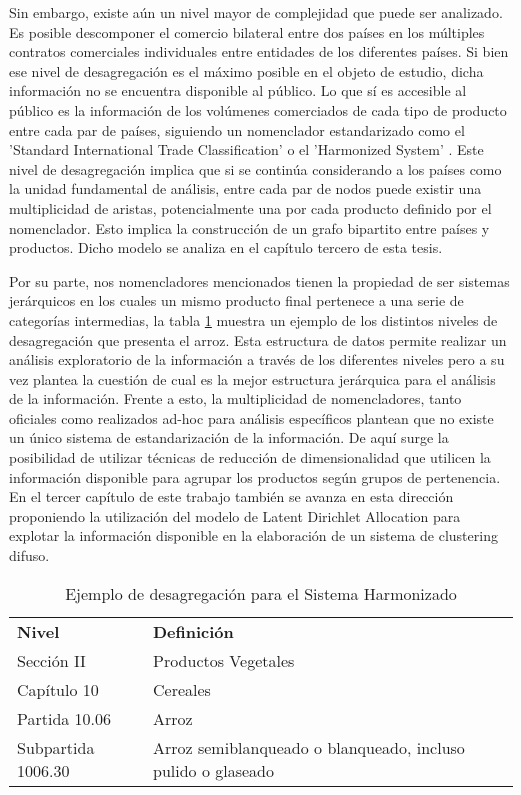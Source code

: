 \documentclass[class=article, crop=false]{standalone}
\begin{document}
Sin embargo, existe aún un nivel mayor de complejidad que puede ser analizado. Es posible descomponer el comercio bilateral entre dos países en los múltiples contratos comerciales individuales entre entidades de los diferentes países. Si bien ese nivel de desagregación es el máximo posible en el objeto de estudio, dicha información no se encuentra disponible al público. Lo que sí es accesible al público es la información de los volúmenes comerciados de cada tipo de producto entre cada par de países, siguiendo un nomenclador estandarizado como el 'Standard International Trade Classification' \citep{united2006standard} o el 'Harmonized System' \citep{weerth2008basic}. 
Este nivel de desagregación implica que si se continúa considerando a los países como la unidad fundamental de análisis, entre cada par de nodos puede existir una multiplicidad de aristas, potencialmente una por cada producto definido por el nomenclador. Esto implica la construcción de un grafo bipartito entre países y productos. Dicho modelo se analiza en el capítulo tercero de esta tesis. 

Por su parte, nos nomencladores mencionados tienen la propiedad de ser sistemas jerárquicos en los cuales un mismo producto final pertenece a una serie de categorías intermedias, la tabla  \ref{table:ejemplo-hs} muestra un ejemplo de los distintos niveles de desagregación que presenta el arroz. Esta estructura de datos permite realizar un análisis exploratorio de la información a través de los diferentes niveles pero a su vez plantea la cuestión de cual es la mejor estructura jerárquica para el análisis de la información. Frente a esto, la multiplicidad de nomencladores, tanto oficiales como realizados ad-hoc para análisis específicos \citep{molinari2016especializacion} plantean que no existe un único sistema de estandarización de la información. De aquí surge la posibilidad de utilizar técnicas de reducción de dimensionalidad que utilicen la información disponible para agrupar los productos según grupos de pertenencia. En el tercer capítulo de este trabajo también se avanza en esta dirección proponiendo la utilización del modelo de Latent Dirichlet Allocation \citep{blei2003latent} para explotar la información disponible en la elaboración de un sistema de clustering difuso. 


\begin{table}[]
	\begin{tabular}{ll}
		\textbf{Nivel}     & \textbf{Definición}                                          \\
		Sección II         & Productos Vegetales                                          \\
		Capítulo 10        & Cereales                                                     \\
		Partida 10.06      & Arroz                                                        \\
		Subpartida 1006.30 & Arroz semiblanqueado o blanqueado, incluso pulido o glaseado
	\end{tabular}
	\caption{Ejemplo de desagregación para el Sistema Harmonizado}
	\label{table:ejemplo-hs}
\end{table}





%
%
%
\end{document}
